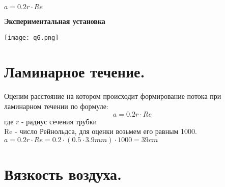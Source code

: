 \documentclass{article}
\begin{document}
\begin{center}
    $a=0.2r \cdot Re$
\end{center}  
\textbf{Экспериментальная установка}
\begin{center} 
    \texttt{[image: q6.png]} 
\end{center}
\section{Ламинарное течение.}
    Оценим расстояние на котором происходит формирование потока при ламинарном течении по формуле: 
    \begin{equation}
        a=0.2r \cdot Re
    \end{equation}
    где $r$ - радиус сечения трубки\\
    Re - число Рейнольдса, для оценки возьмем его равным 1000.\\
    $a = 0.2r \cdot Re = 0.2 \cdot (0.5 \cdot 3.9mm)  \cdot 1000 = 39cm$

\section{Вязкость воздуха.}
\end{document}
